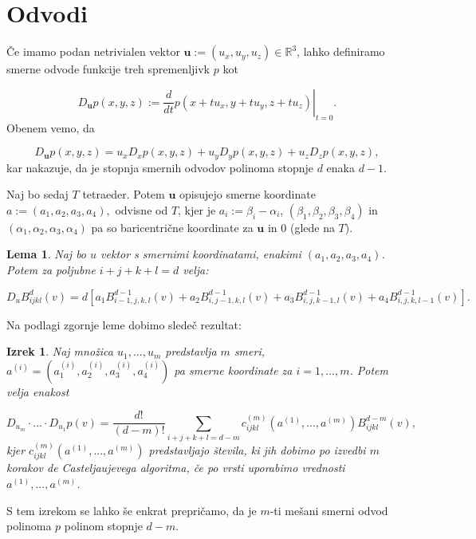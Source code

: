 \documentclass[12pt,a4paper]{amsart}
\theoremstyle{definition} %
\theoremstyle{plain} %
\newtheorem{lema}[definicija]{Lema}
\newtheorem{izrek}[definicija]{Izrek}
\begin{document}
\section{Odvodi}

Če imamo podan netrivialen vektor $\textbf{u} := (u_x,u_y,u_z) \in \mathbb{R}^3$, 
lahko definiramo smerne odvode funkcije treh spremenljivk $p$ kot 

$$
\left.D_{\textbf{u}}p(x,y,z):=\frac{d}{dt}p(x+tu_x,y+tu_y,z+tu_z)\right|_{t=0}.
$$
\newline
Obenem vemo, da 

$$
D_{\textbf{u}}p(x,y,z) = u_xD_xp(x,y,z)+u_yD_yp(x,y,z)+u_zD_zp(x,y,z),
$$
\newline
kar nakazuje, da je stopnja smernih odvodov polinoma stopnje $d$
enaka $d-1$.
\newline

Naj bo sedaj $T$ tetraeder. Potem $\textbf{u}$ 
opisujejo smerne koordinate $a := (a_1,a_2,a_3,a_4),$
odvisne od $T$, kjer je $a_i := \beta_i-\alpha_i$,
$(\beta_1,\beta_2,\beta_3,\beta_4)$ in $(\alpha_1,\alpha_2,\alpha_3,\alpha_4)$ 
pa so baricentrične koordinate za $\textbf{u}$ in 0 (glede na $T$).

\begin{lema}
    Naj bo $u$ vektor s smernimi koordinatami, 
    enakimi $(a_1,a_2,a_3,a_4)$. Potem za poljubne 
    $i+j+k+l=d$ velja:

    $$
    D_uB_{ijkl}^d(v)=
    d[a_1B_{i-1,j,k,l}^{d-1}(v)+
    a_2B_{i,j-1,k,l}^{d-1}(v)+
    a_3B_{i,j,k-1,l}^{d-1}(v)+
    a_4B_{i,j,k,l-1}^{d-1}(v)
    ].
    $$
\end{lema}
Na podlagi zgornje leme dobimo sledeč rezultat:


\begin{izrek}
    Naj množica $u_1,...,u_m$ predstavlja $m$
    smeri, $a^{(i)}=(a_1^{(i)},a_2^{(i)},a_3^{(i)},a_4^{(i)})$ 
    pa smerne koordinate za $i = 1,...,m$. Potem velja
    enakost

    $$
    D_{u_m}\cdot ... \cdot D_{u_{1}}p(v) = \frac{d!}{(d-m)!}\sum_{i+j+k+l=d-m}
    c_{ijkl}^{(m)}(a^{(1)},...,a^{(m)})B_{ijkl}^{d-m}(v),
    $$
    \newline 
    kjer $c^{(m)}_{ijkl}(a^{(1)},...,a^{(m)})$ predstavljajo števila, ki jih 
    dobimo po izvedbi $m$ korakov de Casteljaujevega algoritma, če  
    po vrsti uporabimo vrednosti $a^{(1)},...,a^{(m)}$.
\end{izrek}

S tem izrekom se lahko še enkrat prepričamo, da 
je $m$-ti mešani smerni odvod polinoma $p$ 
polinom stopnje $d-m$.
\end{document}
